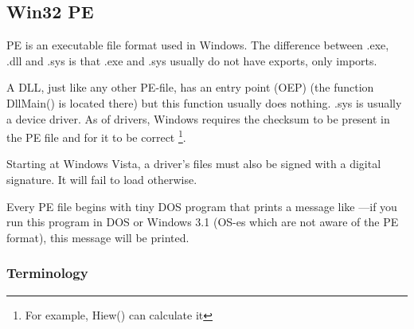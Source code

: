 \subsection{Win32 PE}
\label{win32_pe}

\acs{PE} is an executable file format used in Windows.
The difference between .exe, .dll and .sys is that .exe and .sys usually do not have exports, only imports.


A \ac{DLL}, just like any other PE-file, has an entry point (\ac{OEP}) (the function DllMain() is located there)
but this function usually does nothing.
.sys is usually a device driver.
As of drivers, Windows requires the checksum to be present in the PE file and for it to be correct
\footnote{For example, Hiew() can calculate it}.

Starting at Windows Vista, a driver's files must also be signed with a digital signature. It will fail to load otherwise.

Every PE file begins with tiny DOS program that prints a
message like ---if you run this program in DOS or Windows 3.1 (\ac{OS}-es which are not aware of the PE format),
this message will be printed.

\subsubsection{Terminology}


